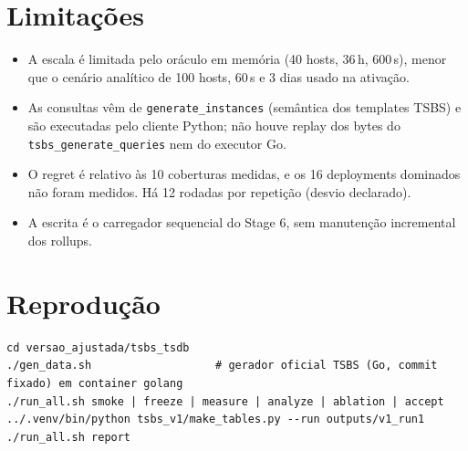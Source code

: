 \documentclass[11pt,a4paper]{article}
\begin{document}
\section{Limitações}
\begin{itemize}
\item A escala é limitada pelo oráculo em memória (40 hosts, 36\,h, 600\,s), menor que o cenário analítico de 100 hosts, 60\,s e 3 dias usado na ativação.
\item As consultas vêm de \texttt{generate\_instances} (semântica dos templates TSBS) e são executadas pelo cliente Python; não houve replay dos bytes do \texttt{tsbs\_generate\_queries} nem do executor Go.
\item O regret é relativo às 10 coberturas medidas, e os 16 deployments dominados não foram medidos. Há 12 rodadas por repetição (desvio declarado).
\item A escrita é o carregador sequencial do Stage 6, sem manutenção incremental dos rollups.
\end{itemize}

\appendix
\section{Reprodução}
\begin{verbatim}
cd versao_ajustada/tsbs_tsdb
./gen_data.sh                   # gerador oficial TSBS (Go, commit fixado) em container golang
./run_all.sh smoke | freeze | measure | analyze | ablation | accept
../.venv/bin/python tsbs_v1/make_tables.py --run outputs/v1_run1
./run_all.sh report
\end{verbatim}
\end{document}
